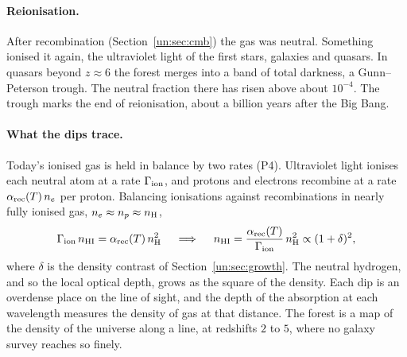 \paragraph{Reionisation.} After recombination (Section~\ref{un:sec:cmb}) the gas was neutral. Something ionised it again, the ultraviolet light of the first stars, galaxies and quasars. In quasars beyond $z\approx6$ the forest merges into a band of total darkness, a Gunn--Peterson trough. The neutral fraction there has risen above about $10^{-4}$. The trough marks the end of reionisation, about a billion years after the Big Bang.

\paragraph{What the dips trace.} Today's ionised gas is held in balance by two rates (P4). Ultraviolet light ionises each neutral atom at a rate $\Gamma_{\rm ion}$, and protons and electrons recombine at a rate $\alpha_{\rm rec}(T)\,n_e$ per proton. Balancing ionisations against recombinations in nearly fully ionised gas, $n_e\approx n_p\approx n_{\rm H}$,
\[
\Gamma_{\rm ion}\,n_{\rm HI}=\alpha_{\rm rec}(T)\,n_{\rm H}^2\quad\implies\quad n_{\rm HI}=\frac{\alpha_{\rm rec}(T)}{\Gamma_{\rm ion}}\,n_{\rm H}^2\propto(1+\delta)^2 ,
\]
where $\delta$ is the density contrast of Section~\ref{un:sec:growth}. The neutral hydrogen, and so the local optical depth, grows as the square of the density. Each dip is an overdense place on the line of sight, and the depth of the absorption at each wavelength measures the density of gas at that distance. The forest is a map of the density of the universe along a line, at redshifts $2$ to $5$, where no galaxy survey reaches so finely.

